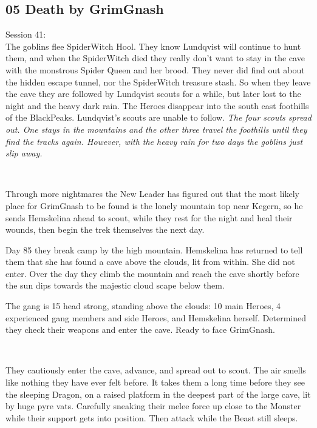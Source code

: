 \subsection*{05 Death by GrimGnash}

\forceindent Session 41:\\                                              %
The goblins flee SpiderWitch Hool. They know Lundqvist will continue to hunt them, and when the SpiderWitch died they really don't want to stay in the cave with the monstrous Spider Queen and her brood. They never did find out about the hidden escape tunnel, nor the SpiderWitch treasure stash. So when they leave the cave they are followed by Lundqvist scouts for a while, but later lost to the night and the heavy dark rain. The Heroes disappear into the south east foothills of the BlackPeaks. Lundqvist's scouts are unable to follow. \textit{The four scouts spread out. One stays in the mountains and the other three travel the foothills until they find the tracks again. However, with the heavy rain for two days the goblins just slip away.}

\

Through more nightmares the New Leader has figured out that the most likely place for GrimGnash to be found is the lonely mountain top near Kegern, so he sends Hemskelina ahead to scout, while they rest for the night and heal their wounds, then begin the trek themselves the next day.

Day 85 they break camp by the high mountain. Hemskelina has returned to tell them that she has found a cave above the clouds, lit from within. She did not enter. Over the day they climb the mountain and reach the cave shortly before the sun dips towards the majestic cloud scape below them.

The gang is 15 head strong, standing above the clouds: 10 main Heroes, 4 experienced gang members and side Heroes, and Hemskelina herself.
Determined they check their weapons and enter the cave. Ready to face GrimGnash.

\

They cautiously enter the cave, advance, and spread out to scout. The air smells like nothing they have ever felt before. It takes them a long time before they see the sleeping Dragon, on a raised platform in the deepest part of the large cave, lit by huge pyre vats. Carefully sneaking their melee force up close to the Monster while their support gets into position. Then attack while the Beast still sleeps.

